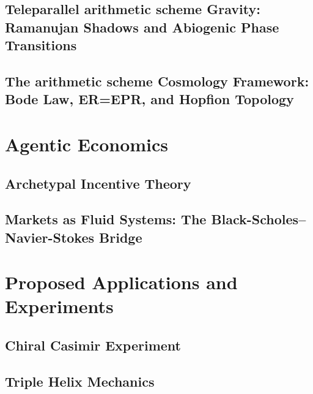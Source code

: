\documentclass[12pt,oneside]{book}
\theoremstyle{principia}
\theoremstyle{definition}
\theoremstyle{remark}
\begin{document}
\chapter[Teleparallel Gravity]{Teleparallel arithmetic scheme Gravity: Ramanujan Shadows and Abiogenic Phase Transitions}\label{ch:tegr}


\chapter[Extended Cosmology]{The arithmetic scheme Cosmology Framework: Bode Law, ER=EPR, and Hopfion Topology}\label{ch:cosmo-ext}


\part{Agentic Economics}

\chapter[Archetypal Incentives]{Archetypal Incentive Theory}\label{ch:incentives}


\chapter[Markets as Fluid Systems]{Markets as Fluid Systems: The Black-Scholes--Navier-Stokes Bridge}


\part{Proposed Applications and Experiments}

\chapter[Chiral Casimir]{Chiral Casimir Experiment}


\chapter[Triple Helix]{Triple Helix Mechanics}

\end{document}
